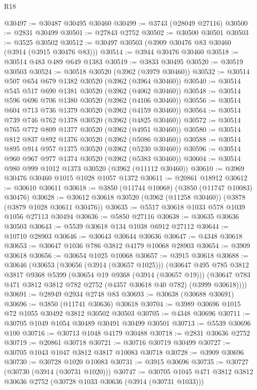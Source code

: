 \begin{lexlean}{R18}
\begin{coremodule}
@30497 := @30487 @30495 @30460
@30499 := @3743 (@28049 @27116)
@30500 := @2831 @30499
@30501 := @27843 @2752
@30502 := @30500 @30501
@30503 := @3525 @30502
@30512 := @30497 @30503 (@3909 @30476 @83 @30460 (@3914 (@3915 @30476 @83)))
@30514 := @3944 @30476 @30460
@30518 := @30514 @483 @489 @649 @1383
@30519 := @3833 @30495
@30520 := @30519 @30503
@30524 := @30518 @30520 (@3962 (@3979 @30460))
@30532 := @30514 @507 @654 @679 @1382 @30520 (@3962 (@3964 @30460))
@30540 := @30514 @545 @517 @690 @1381 @30520 (@3962 (@4062 @30460))
@30548 := @30514 @596 @696 @706 @1380 @30520 (@3962 (@4106 @30460))
@30556 := @30514 @604 @713 @736 @1379 @30520 (@3962 (@4159 @30460))
@30564 := @30514 @739 @746 @762 @1378 @30520 (@3962 (@4825 @30460))
@30572 := @30514 @765 @772 @809 @1377 @30520 (@3962 (@4951 @30460))
@30580 := @30514 @812 @837 @892 @1376 @30520 (@3962 (@5086 @30460))
@30588 := @30514 @895 @914 @957 @1375 @30520 (@3962 (@5230 @30460))
@30596 := @30514 @960 @967 @977 @1374 @30520 (@3962 (@5383 @30460))
@30604 := @30514 @980 @999 @1012 @1373 @30520 (@3962 (@11112 @30460))
@30610 := @3969 @30476 @30460 @1015 @1028 @1057 @1372
@30611 := @20861 @18912
@30612 := @30610 @30611
@30618 := @3850 (@11744 @10068) (@3850 (@11747 @10083) @30476)
@30628 := @30612 @30618 @30520 (@3962 (@11258 @30460)) (@3878 (@3879 @1028 @30611 @30476))
@30635 := @5517 @30618 @1033 @578 @1039 @1056 @27113 @30494
@30636 := @5850 @27116
@30638 := @30635 @30636 @30503
@30643 := @5539 @30618 @134 @1038 @6912 @27112
@30644 := @10710 @28903
@30646 := @30643 @30644 @30636
@30647 := @4348 @30618
@30653 := @30647 @1036 @786 @3812 @4179 @10068 @28903
@30654 := @3909 @30618
@30656 := @30654 @1025 @10068
@30657 := @3915 @30618
@30688 := @30646
    (@30653
      (@30656 (@3914 (@30657 @1025)))
      (@30647
        @495
        @785
        @3812
        @3817
        @9368
        @5399
        (@30654 @19 @9368 (@3914 (@30657 @19)))
        (@30647 @783 @471 @3812 @3812 @782 @2752 (@4357 @30618 @40 @782) (@3999 @30618))))
@30691 := @28949 @2934 @2748 @83
@30693 := @30638 (@30688 @30691)
@30696 := @3850 (@11741 @30636) @30618
@30704 := @3989 @30696 @1015 @72 @1055 @30492 @3812 @30502 @30503
@30705 := @4348 @30696
@30711 := @30705 @1049 @1054 @30489 @30491 @30499 @30501
@30713 := @5539 @30696 @100
@30716 := @30713 @1048 @4179 @30488
@30718 := @2831 @30636 @2752
@30719 := @20861 @30718
@30721 := @30716 @30719 @30499
@30727 := @30705 @1043 @1047 @3812 @3817 @10083 @30718
@30728 := @3909 @30696
@30730 := @30728 @1020 @10083
@30731 := @3915 @30696
@30735 := @30727 (@30730 (@3914 (@30731 @1020)))
@30747 := @30705 @1045 @471 @3812 @3812 @30636 @2752 (@30728 @1033 @30636 (@3914 (@30731 @1033)))

\end{coremodule}
\end{lexlean}
